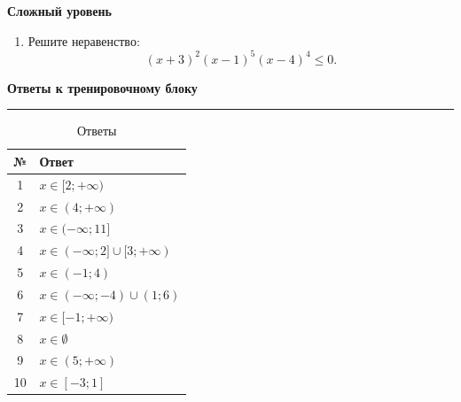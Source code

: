 \documentclass[a4paper,12pt]{article}
\newcommand{\sectiontitle}[1]{%
  \vspace{0.6em}
  {\Large\bfseries\textcolor{darkaccent}{#1}}\par
  \vspace{0.25em}
  {\color{accent}\rule{\linewidth}{0.5pt}}
  \vspace{0.4em}
}
\newcommand{\subsectiontitle}[1]{%
  \vspace{0.5em}
  {\large\bfseries\textcolor{darkaccent}{#1}}\par
  \vspace{0.15em}
}
\begin{document}
\subsectiontitle{Сложный уровень}

\begin{enumerate}[resume]
  \item Решите неравенство:
  \[
  (x+3)^2(x-1)^5(x-4)^4\le 0.
  \]
\end{enumerate}

\newpage

\sectiontitle{Ответы к тренировочному блоку}

\begin{table}[h!]
\centering
\caption{Ответы}
\renewcommand{\arraystretch}{1.45}
\begin{tabularx}{\linewidth}{@{}c X@{}}
\toprule
№ & Ответ \\
\midrule
1 & $x\in[2;+\infty)$ \\
2 & $x\in(4;+\infty)$ \\
3 & $x\in(-\infty;11]$ \\
4 & $x\in(-\infty;2]\cup[3;+\infty)$ \\
5 & $x\in(-1;4)$ \\
6 & $x\in(-\infty;-4)\cup(1;6)$ \\
7 & $x\in[-1;+\infty)$ \\
8 & $x\in\emptyset$ \\
9 & $x\in(5;+\infty)$ \\
10 & $x\in[-3;1]$ \\
\bottomrule
\end{tabularx}
\end{table}
\end{document}
